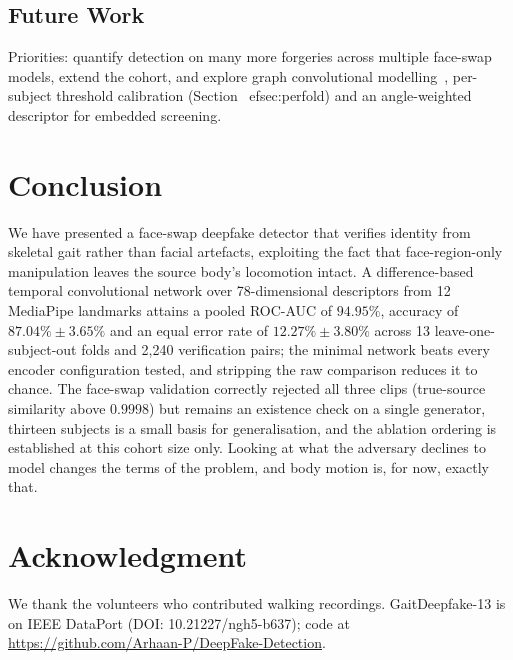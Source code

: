 \documentclass[conference]{IEEEtran}
\newif\ifismanon
\begin{document}
\subsection{Future Work}

Priorities: quantify detection on many more forgeries across multiple face-swap models, extend the cohort, and explore graph convolutional modelling~\cite{gaitgraph}, per-subject threshold calibration (Section~
ef{sec:perfold}) and an angle-weighted descriptor for embedded screening.

\section{Conclusion}
\label{sec:conclusion}

We have presented a face-swap deepfake detector that verifies identity from
skeletal gait rather than facial artefacts, exploiting the fact that
face-region-only manipulation leaves the source body's locomotion intact. A
difference-based temporal convolutional network over 78-dimensional descriptors
from 12 MediaPipe landmarks attains a pooled ROC-AUC of $94.95\%$, accuracy of
$87.04\% \pm 3.65\%$ and an equal error rate of $12.27\% \pm 3.80\%$ across 13
leave-one-subject-out folds and 2{,}240 verification pairs; the minimal network
beats every encoder configuration tested, and stripping the raw comparison
reduces it to chance. The face-swap validation correctly rejected all three
clips (true-source similarity above $0.9998$) but remains an existence check on
a single generator, thirteen subjects is a small basis for generalisation, and
the ablation ordering is established at this cohort size only. Looking at what the adversary declines to model changes the terms of the problem, and body motion is, for now, exactly that.

\ifismanon\else
\section*{Acknowledgment}
We thank the volunteers who contributed walking recordings. GaitDeepfake-13 is
on IEEE DataPort (DOI: 10.21227/ngh5-b637); code at
\url{https://github.com/Arhaan-P/DeepFake-Detection}.
\fi



\end{document}
